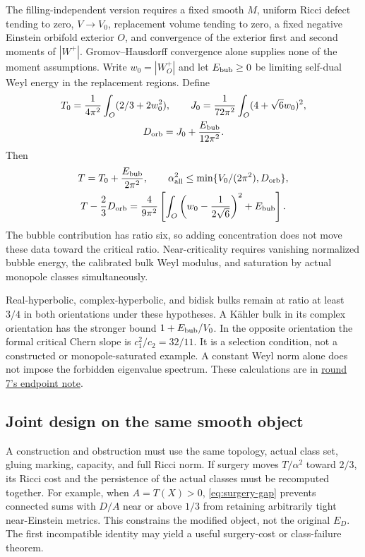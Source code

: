 \documentclass[11pt,a4paper]{article}
\theoremstyle{definition}
\theoremstyle{remark}
\newcommand{\roundref}[2]{\href{run:../references/rounds/#1}{#2}}
\numberwithin{equation}{section}
\begin{document}
The filling-independent version requires a fixed smooth $M$, uniform
Ricci defect tending to zero, $V\to V_0$, replacement volume tending
to zero, a fixed negative Einstein orbifold exterior $O$, and convergence
of the exterior first and second moments of $|W^+|$. Gromov--Hausdorff
convergence alone supplies none of the moment assumptions. Write
$w_0=|W_O^+|$ and let $E_{\rm bub}\ge0$ be limiting self-dual Weyl
energy in the replacement regions. Define
\begin{gather*}
 T_0=\frac1{4\pi^2}\int_O(2/3+2w_0^2),\qquad
 J_0=\frac1{72\pi^2}\int_O(4+\sqrt6w_0)^2,\\
 D_{\rm orb}=J_0+\frac{E_{\rm bub}}{12\pi^2}.
\end{gather*}
Then
\begin{gather}
 T=T_0+\frac{E_{\rm bub}}{2\pi^2},\qquad
 \alpha_{\rm all}^2\le\min\{V_0/(2\pi^2),D_{\rm orb}\},\notag\\
 T-\frac23D_{\rm orb}
 =\frac4{9\pi^2}\left[
       \int_O\left(w_0-\frac1{2\sqrt6}\right)^2+E_{\rm bub}\right].
                                                        \label{eq:concentration}
\end{gather}
The bubble contribution has ratio six, so adding concentration does not
move these data toward the critical ratio. Near-criticality requires
vanishing normalized bubble energy, the calibrated bulk Weyl modulus,
and saturation by actual monopole classes simultaneously.

Real-hyperbolic, complex-hyperbolic, and bidisk bulks remain at ratio at
least $3/4$ in both orientations under these hypotheses. A K\"ahler bulk
in its complex orientation has the stronger bound
$1+E_{\rm bub}/V_0$. In the opposite orientation the formal critical
Chern slope is $c_1^2/c_2=32/11$. It is a selection condition, not a
constructed or monopole-saturated example. A constant Weyl norm alone
does not impose the forbidden eigenvalue spectrum. These calculations
are in \roundref{round7_endpoint.md}{round 7's endpoint note}.

\subsection{Joint design on the same smooth object}\label{sub:joint-design}
A construction and obstruction must use the same topology, actual class
set, gluing marking, capacity, and full Ricci norm. If surgery moves
$T/\alpha^2$ toward $2/3$, its Ricci cost and the persistence of the
actual classes must be recomputed together. For example, when
$A=T(X)>0$, \eqref{eq:surgery-gap} prevents connected sums with $D/A$
near or above $1/3$ from retaining arbitrarily tight near-Einstein
metrics. This constrains the modified object, not the original $E_D$.
The first incompatible identity may yield a useful surgery-cost or
class-failure theorem.
\end{document}
